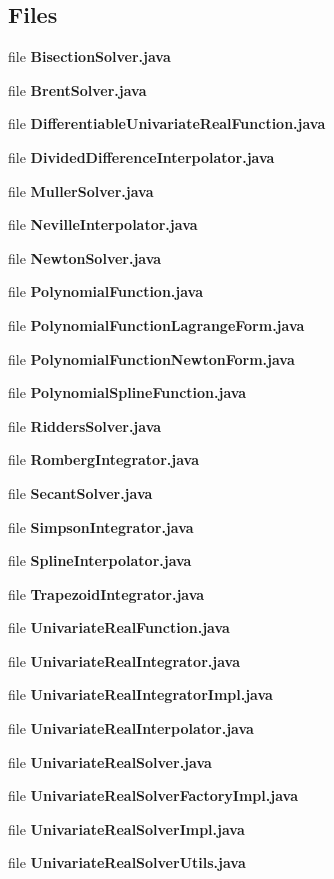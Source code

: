 \subsection*{Files}
\begin{DoxyCompactItemize}
\item 
file {\bfseries Bisection\-Solver.\-java}
\item 
file {\bfseries Brent\-Solver.\-java}
\item 
file {\bfseries Differentiable\-Univariate\-Real\-Function.\-java}
\item 
file {\bfseries Divided\-Difference\-Interpolator.\-java}
\item 
file {\bfseries Muller\-Solver.\-java}
\item 
file {\bfseries Neville\-Interpolator.\-java}
\item 
file {\bfseries Newton\-Solver.\-java}
\item 
file {\bfseries Polynomial\-Function.\-java}
\item 
file {\bfseries Polynomial\-Function\-Lagrange\-Form.\-java}
\item 
file {\bfseries Polynomial\-Function\-Newton\-Form.\-java}
\item 
file {\bfseries Polynomial\-Spline\-Function.\-java}
\item 
file {\bfseries Ridders\-Solver.\-java}
\item 
file {\bfseries Romberg\-Integrator.\-java}
\item 
file {\bfseries Secant\-Solver.\-java}
\item 
file {\bfseries Simpson\-Integrator.\-java}
\item 
file {\bfseries Spline\-Interpolator.\-java}
\item 
file {\bfseries Trapezoid\-Integrator.\-java}
\item 
file {\bfseries Univariate\-Real\-Function.\-java}
\item 
file {\bfseries Univariate\-Real\-Integrator.\-java}
\item 
file {\bfseries Univariate\-Real\-Integrator\-Impl.\-java}
\item 
file {\bfseries Univariate\-Real\-Interpolator.\-java}
\item 
file {\bfseries Univariate\-Real\-Solver.\-java}
\item 
file {\bfseries Univariate\-Real\-Solver\-Factory\-Impl.\-java}
\item 
file {\bfseries Univariate\-Real\-Solver\-Impl.\-java}
\item 
file {\bfseries Univariate\-Real\-Solver\-Utils.\-java}
\end{DoxyCompactItemize}
